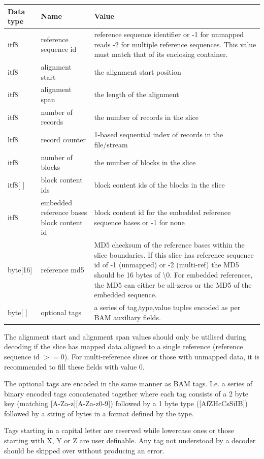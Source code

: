 \documentclass[a4paper]{article}
\begin{document}
\begin{tabular}{|l|l|>{\raggedright}p{200pt}|}
\hline
\textbf{Data type} & \textbf{Name} & \textbf{Value}\tabularnewline
\hline
itf8 & reference sequence id & reference sequence identifier or\linebreak{}
-1 for unmapped reads\linebreak{}
-2 for multiple reference sequences.\linebreak{}
This value must match that of its enclosing container.\tabularnewline
\hline
itf8 & alignment start & the alignment start position\tabularnewline
\hline
itf8 & alignment span & the length of the alignment\tabularnewline
\hline
itf8 & number of records & the number of records in the slice\tabularnewline
\hline
ltf8 & record counter & 1-based sequential index of records in the file/stream\tabularnewline
\hline
itf8 & number of blocks & the number of blocks in the slice\tabularnewline
\hline
itf8[ ] & block content ids & block content ids of the blocks in the slice\tabularnewline
\hline
itf8 & embedded reference bases block content id & block content id for the embedded 
reference sequence bases or -1 for none\tabularnewline
\hline
byte[16] & reference md5 & MD5 checksum of the reference bases within the slice 
boundaries.  If this slice has reference sequence id of -1 (unmapped) or -2 (multi-ref)
the MD5 should be 16 bytes of \textbackslash{}0. For embedded references, the MD5
can either be all-zeros or the MD5 of the embedded sequence.\tabularnewline
\hline
byte[ ] & optional tags & a series of tag,type,value tuples encoded as
per BAM auxiliary fields.\tabularnewline
\hline
\end{tabular}

The alignment start and alignment span values should only be utilised
during decoding if the slice has mapped data aligned to a single
reference (reference sequence id $>= 0$).  For multi-reference slices
or those with unmapped data, it is recommended to fill these fields
with value 0.

The optional tags are encoded in the same manner as BAM tags.  I.e. a
series of binary encoded tags concatenated together where each tag
consists of a 2 byte key (matching [A-Za-z][A-Za-z0-9]) followed by a
1 byte type ([AfZHcCsSiIB]) followed by a string of bytes in a format
defined by the type.

Tags starting in a capital letter are reserved while lowercase ones or
those starting with X, Y or Z are user definable.  Any tag not
understood by a decoder should be skipped over without producing an
error.
\end{document}
